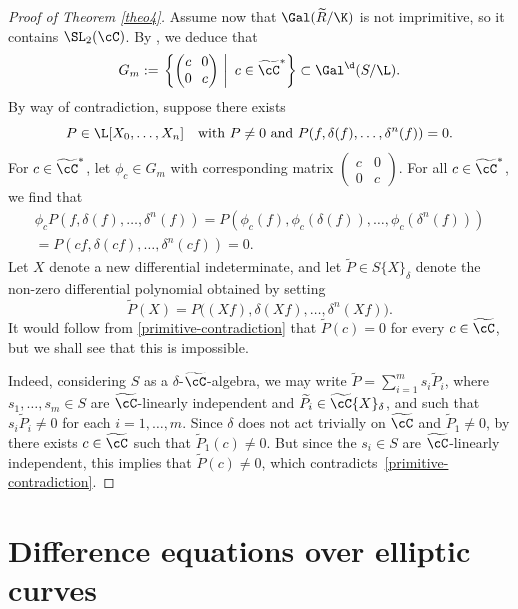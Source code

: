\begin{proof}[Proof of Theorem \ref{theo4}]
Assume now that $\Gal(\widetilde{R}/\K)$ is not imprimitive, so it contains $\SL_{2}(\cC)$. By \cite[Prop.\,2.10]{DHR}, we deduce that
\[\arraycolsep3.5pt
G_{m}:=\left.\left\{\begin{pmatrix}
c & 0\\
0 & c
\end{pmatrix} \ \right| \ c \in \widetilde{\cC}^{*} \right\} \subset \Gal^{\d}(S/\L).
\]
By way of contradiction, suppose there exists
\[
P\in \L [X_{0},\dots,X_{n}]\quad \text{with } P\neq0\text{ and }P(f,\delta (f),\dots,\delta^{n}(f))=0.
\]
For $c\in \widetilde{\cC}^{*}$, let $\phi_{c}\in G_{m}$ with corresponding matrix $\left(\begin{smallmatrix}
c&0\\
0&c
\end{smallmatrix}\right)$.
For all $c\in \widetilde{\cC}^{*}$, we find that\vspace*{-5pt}
\begin{multline}\label{primitive-contradiction}
\phi_{c} P(f,\delta (f),\dots,\delta^{n}(f))=P(\phi_{c} (f),\phi_{c}(\delta (f)),\dots,\phi_{c}(\delta^{n}(f)))
\\=P(cf,\delta (cf),\dots,\delta^{n}(cf))=0.
\end{multline}
Let $X$ denote a new differential indeterminate, and let $\widetilde{P}\in{S}\{X\}_\delta$ denote the non-zero differential polynomial obtained by setting
\[
\widetilde{P}(X)=P\bigl((Xf),\delta(Xf),\dots,\delta^n(Xf)\bigr).
\]
It would follow from \eqref{primitive-contradiction} that $\widetilde{P}(c)=0$ for every $c\in\widetilde{\cC}$, but we shall see that this is impossible.

Indeed, considering ${S}$ as a $\delta$-$\widetilde{\cC}$-algebra, we may write $\widetilde{P}=\sum_{i=1}^m s_i \widetilde{P}_i$, where $s_1,\dots,s_m\in{S}$ are $\widetilde{\cC}$-linearly independent and $\widetilde{P}_i\in \widetilde{\cC}\{X\}_\delta$, and such that $s_i\widetilde{P}_i\neq 0$ for each $i=1,\dots,m$. Since $\delta$ does not act trivially on $\widetilde{\cC}$ and $\widetilde{P}_1\neq 0$, by \cite[Cor.\,II.6]{Kol73} there exists $c\in\widetilde{\cC}$ such that $\widetilde{P}_1(c)\neq 0$. But since the $s_i\in{S}$ are $\widetilde{\cC}$-linearly independent, this implies that $\widetilde{P}(c)\neq 0$, which contradicts~\eqref{primitive-contradiction}. \end{proof}

\section{Difference equations over elliptic curves}\label{sec3}

